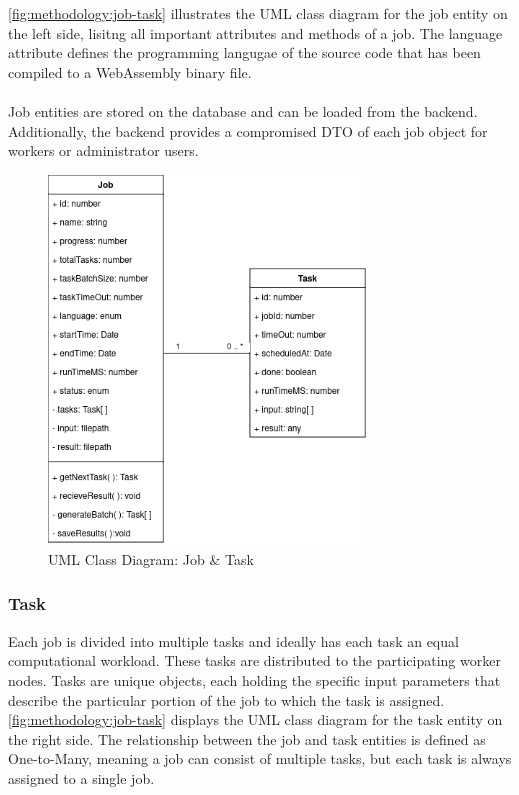 \autoref{fig:methodology:job-task} illustrates the \ac{UML} class diagram for the job entity on the left side, lisitng all important attributes and methods of a job. The language attribute defines the programming langugae of the source code that has been compiled to a WebAssembly binary file.
\\~\\
Job entities are stored on the database and can be loaded from the backend. Additionally, the backend provides a compromised \ac{DTO} of each job object for workers or administrator users.
\begin{figure}[htbp]
    \centering
    \includegraphics[width=0.75\textwidth]{gfx/figures/Job-Task.png}
    \caption{\acs{UML} Class Diagram: Job \& Task}
    \label{fig:methodology:job-task}
\end{figure}

\subsubsection{Task}
Each job is divided into multiple tasks and ideally has each task an equal computational workload. These tasks are distributed to the participating worker nodes. Tasks are unique objects, each holding the specific input parameters that describe the particular portion of the job to which the task is assigned. \autoref{fig:methodology:job-task} displays the \ac{UML} class diagram for the task entity on the right side. The relationship between the job and task entities is defined as One-to-Many, meaning a job can consist of multiple tasks, but each task is always assigned to a single job.

